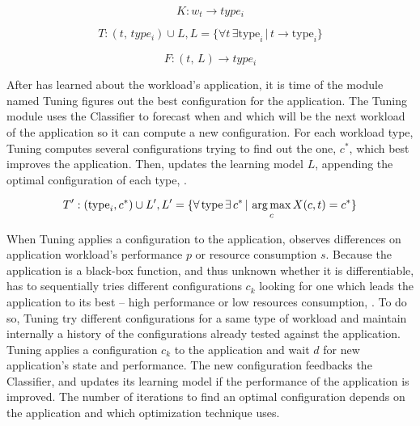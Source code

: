 \begin{equation}
  K: w_t \rightarrow type_i
  \label{eq:classify}
\end{equation}

\begin{equation}
  T: (t,\, type_i) \cup L, L = \{ \forall t\,\exists \text{type}_i\, |\, t \rightarrow \text{type}_i \}
  \label{eq:training}
\end{equation}

\begin{equation}
  F: (t, \, L) \rightarrow type_i
  \label{eq:forecast}
\end{equation}

After \name has learned about the workload's application,  it is time of the module named
Tuning figures out the best configuration for the application. The Tuning module
uses the Classifier to forecast when and which will be the next workload of the
application so it can compute a new configuration. For each workload type,
Tuning computes several configurations trying to find out the one, $c^{*}$,
which best improves the application. Then, \name updates the learning model $L$,
appending the optimal configuration of each type, .

\begin{equation}
  T': (\text{type}_i, c^{*} )\cup L', L' = \{ \forall\, \text{type}\, \exists\, c^{*}\, |\, \operatorname*{arg\,max}_c X(c,t) = c^{*}\}
  \label{eq:training-updated}
\end{equation}

When Tuning applies a configuration to the application, \name observes
differences on application workload's performance $p$ or resource consumption
$s$. Because the application is a black-box function, and thus unknown whether
it is differentiable, \name has to sequentially tries different configurations
$c_k$ looking for one which leads the application to its best -- high
performance or low resources consumption, . To do so,
Tuning try different configurations for a same type of workload and maintain
internally a history of the configurations already tested against the
application.  Tuning applies a configuration $c_k$ to the application and wait
$d$ for new application's state and performance. The new configuration feedbacks
the Classifier, and updates its learning model if the performance of the
application is improved. The number of iterations to find an optimal
configuration depends on the application and which optimization technique \name
uses.

